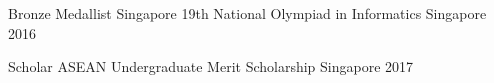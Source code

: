 



\begin{cvhonors}  
  \cvhonor
    {Bronze Medallist} %
    {Singapore 19th National Olympiad in Informatics} %
    {Singapore} %
    {2016} %
    
    
 \cvhonor
    {Scholar} %
    {ASEAN Undergraduate Merit Scholarship} %
    {Singapore} %
    {2017} %

\end{cvhonors}
